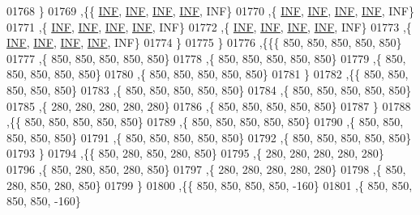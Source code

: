 \begin{DoxyCode}
01768    \}
01769   ,\{\{   \hyperlink{constants_8h_a12c2040f25d8e3a7b9e1c2024c618cb6}{INF},   \hyperlink{constants_8h_a12c2040f25d8e3a7b9e1c2024c618cb6}{INF},   \hyperlink{constants_8h_a12c2040f25d8e3a7b9e1c2024c618cb6}{INF},   \hyperlink{constants_8h_a12c2040f25d8e3a7b9e1c2024c618cb6}{INF},   INF\}
01770    ,\{   \hyperlink{constants_8h_a12c2040f25d8e3a7b9e1c2024c618cb6}{INF},   \hyperlink{constants_8h_a12c2040f25d8e3a7b9e1c2024c618cb6}{INF},   \hyperlink{constants_8h_a12c2040f25d8e3a7b9e1c2024c618cb6}{INF},   \hyperlink{constants_8h_a12c2040f25d8e3a7b9e1c2024c618cb6}{INF},   INF\}
01771    ,\{   \hyperlink{constants_8h_a12c2040f25d8e3a7b9e1c2024c618cb6}{INF},   \hyperlink{constants_8h_a12c2040f25d8e3a7b9e1c2024c618cb6}{INF},   \hyperlink{constants_8h_a12c2040f25d8e3a7b9e1c2024c618cb6}{INF},   \hyperlink{constants_8h_a12c2040f25d8e3a7b9e1c2024c618cb6}{INF},   INF\}
01772    ,\{   \hyperlink{constants_8h_a12c2040f25d8e3a7b9e1c2024c618cb6}{INF},   \hyperlink{constants_8h_a12c2040f25d8e3a7b9e1c2024c618cb6}{INF},   \hyperlink{constants_8h_a12c2040f25d8e3a7b9e1c2024c618cb6}{INF},   \hyperlink{constants_8h_a12c2040f25d8e3a7b9e1c2024c618cb6}{INF},   INF\}
01773    ,\{   \hyperlink{constants_8h_a12c2040f25d8e3a7b9e1c2024c618cb6}{INF},   \hyperlink{constants_8h_a12c2040f25d8e3a7b9e1c2024c618cb6}{INF},   \hyperlink{constants_8h_a12c2040f25d8e3a7b9e1c2024c618cb6}{INF},   \hyperlink{constants_8h_a12c2040f25d8e3a7b9e1c2024c618cb6}{INF},   INF\}
01774    \}
01775   \}
01776  ,\{\{\{   850,   850,   850,   850,   850\}
01777    ,\{   850,   850,   850,   850,   850\}
01778    ,\{   850,   850,   850,   850,   850\}
01779    ,\{   850,   850,   850,   850,   850\}
01780    ,\{   850,   850,   850,   850,   850\}
01781    \}
01782   ,\{\{   850,   850,   850,   850,   850\}
01783    ,\{   850,   850,   850,   850,   850\}
01784    ,\{   850,   850,   850,   850,   850\}
01785    ,\{   280,   280,   280,   280,   280\}
01786    ,\{   850,   850,   850,   850,   850\}
01787    \}
01788   ,\{\{   850,   850,   850,   850,   850\}
01789    ,\{   850,   850,   850,   850,   850\}
01790    ,\{   850,   850,   850,   850,   850\}
01791    ,\{   850,   850,   850,   850,   850\}
01792    ,\{   850,   850,   850,   850,   850\}
01793    \}
01794   ,\{\{   850,   280,   850,   280,   850\}
01795    ,\{   280,   280,   280,   280,   280\}
01796    ,\{   850,   280,   850,   280,   850\}
01797    ,\{   280,   280,   280,   280,   280\}
01798    ,\{   850,   280,   850,   280,   850\}
01799    \}
01800   ,\{\{   850,   850,   850,   850,  -160\}
01801    ,\{   850,   850,   850,   850,  -160\}

\end{DoxyCode}
